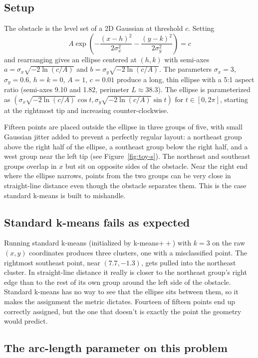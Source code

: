 \documentclass[11pt]{article}
\begin{document}
\subsection{Setup}
 
The obstacle is the level set of a 2D Gaussian at threshold $c$. Setting
\[
A \exp\!\left( -\frac{(x-h)^2}{2\sigma_x^2} - \frac{(y-k)^2}{2\sigma_y^2} \right) = c
\]
and rearranging gives an ellipse centered at $(h, k)$ with semi-axes $a = \sigma_x \sqrt{-2 \ln(c/A)}$ and $b = \sigma_y \sqrt{-2 \ln(c/A)}$. The parameters $\sigma_x = 3$, $\sigma_y = 0.6$, $h = k = 0$, $A = 1$, $c = 0.01$ produce a long, thin ellipse with a 5:1 aspect ratio (semi-axes 9.10 and 1.82, perimeter $L \approx 38.3$). The ellipse is parameterized as $(\sigma_x \sqrt{-2 \ln(c/A)} \cos t, \sigma_y \sqrt{-2 \ln(c/A)} \sin t)$ for $t \in [0, 2\pi]$, starting at the rightmost tip and increasing counter-clockwise.
 
Fifteen points are placed outside the ellipse in three groups of five, with small Gaussian jitter added to prevent a perfectly regular layout: a northeast group above the right half of the ellipse, a southeast group below the right half, and a west group near the left tip (see Figure~\ref{fig:toy-s}). The northeast and southeast groups overlap in $x$ but sit on opposite sides of the obstacle. Near the right end where the ellipse narrows, points from the two groups can be very close in straight-line distance even though the obstacle separates them. This is the case standard k-means is built to mishandle.
 
\subsection{Standard k-means fails as expected}
 
Running standard k-means (initialized by k-means$++$) with $k = 3$ on the raw $(x, y)$ coordinates produces three clusters, one with a misclassified point. The rightmost southeast point, near $(7.7, -1.3)$, gets pulled into the northeast cluster. In straight-line distance it really is closer to the northeast group's right edge than to the rest of its own group around the left side of the obstacle. Standard k-means has no way to see that the ellipse sits between them, so it makes the assignment the metric dictates. Fourteen of fifteen points end up correctly assigned, but the one that doesn't is exactly the point the geometry would predict.
 
\subsection{The arc-length parameter on this problem}
 
\end{document}
